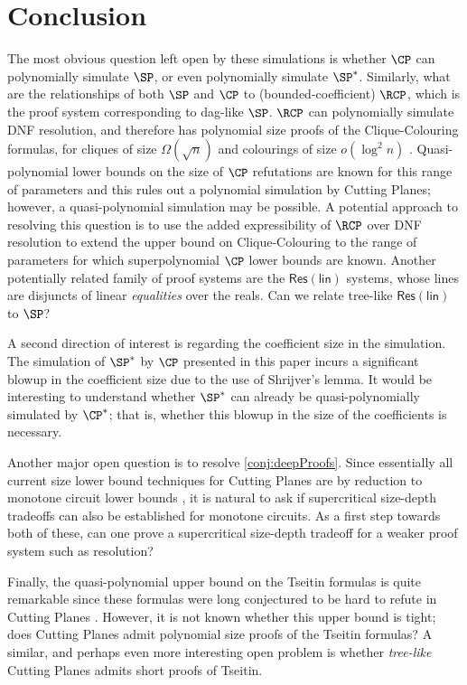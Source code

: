 \documentclass[11pt]{article}
\begin{document}
\section{Conclusion}
The most obvious question left open by these simulations is whether $\CP$ can polynomially simulate $\SP$, or even polynomially simulate $\SP^*$. 
Similarly, what are the relationships of both $\SP$ and $\CP$ to (bounded-coefficient) $\RCP$, which is the proof system corresponding to dag-like $\SP$. 
$\RCP$ can polynomially simulate DNF resolution, and therefore has polynomial size proofs of the Clique-Colouring formulas, for cliques of size $\Omega(\sqrt{n})$ and colourings of size $o(\log^2 n)$ \cite{AtseriasBE02}. 
Quasi-polynomial lower bounds on the size of $\CP$ refutations are known for this range of parameters and this rules out a polynomial simulation by Cutting Planes; however, a quasi-polynomial simulation may be possible. A potential approach to resolving this question is to use the added expressibility of $\RCP$ over DNF resolution to extend the upper bound on Clique-Colouring to the range of parameters for which superpolynomial $\CP$ lower bounds are known.
Another potentially related family of proof systems are the $\mathsf{Res(lin)}$ systems, whose lines are disjuncts of linear \emph{equalities} over the reals.
Can we relate tree-like $\mathsf{Res(lin)}$ to $\SP$?

A second direction of interest is regarding the coefficient size in the simulation. The simulation of $\SP^*$ by $\CP$ presented in this paper incurs a significant blowup in the coefficient size due to the use of Shrijver's lemma. It would be interesting to understand whether $\SP^*$ can already be quasi-polynomially simulated by $\CP^*$; that is, whether this blowup in the size of the coefficients is necessary.

Another major open question is to resolve \autoref{conj:deepProofs}. Since essentially all current size lower bound techniques for Cutting Planes are by reduction to monotone circuit lower bounds \cite{Pudlak97, FlemingPPR17,HrubesP17,GargGKS18}, it is natural to ask if supercritical size-depth tradeoffs can also be established for monotone circuits. As a first step towards both of these, can one prove a supercritical size-depth tradeoff for a weaker proof system such as resolution?

Finally, the quasi-polynomial upper bound on the Tseitin formulas \cite{TseitinUpperBound} is quite remarkable since these formulas were long conjectured to be hard to refute in Cutting Planes \cite{CookCT87}. However, it is not known whether this upper bound is tight; does Cutting Planes admit polynomial size proofs of the Tseitin formulas? A similar, and perhaps even more interesting open problem is whether \emph{tree-like} Cutting Planes admits short proofs of Tseitin. 
\end{document}
